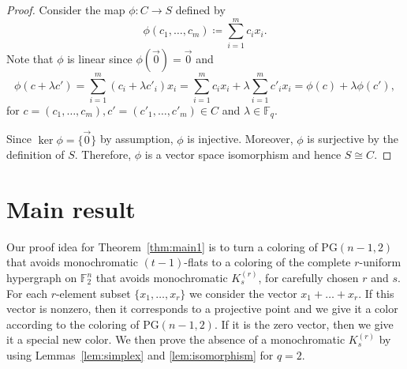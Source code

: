 \documentclass[a4paper,11pt]{amsproc}
\theoremstyle{plain}
\theoremstyle{definition}
\begin{document}
\begin{proof}
    Consider the map $\phi : C \to S$ defined by
    \[
        \phi(c_1,\ldots,c_m)
        \coloneqq \sum_{i=1}^{m} c_i x_i.
    \]
    Note that $\phi$ is linear since $\phi(\vec{0})=\vec{0}$ and
    \[
        \phi(c+\lambda c')
        = \sum_{i=1}^{m} (c_i+\lambda c'_i)x_i
        = \sum_{i=1}^{m} c_i x_i
        + \lambda\sum_{i=1}^{m} c'_i x_i
        = \phi(c)+\lambda\phi(c'),
    \]
    for $c=(c_1,\dots,c_m),c'=(c'_1,\dots,c'_m)\in C$ and
    $\lambda\in\mathbb{F}_q$.

    Since  $\ker \phi = \{\vec{0}\}$ by assumption,
    $\phi$ is injective. 
    Moreover, $\phi$ is surjective
    by the definition of $S$. Therefore, $\phi$ is a vector space isomorphism
    and hence $S \cong C$.
\end{proof}



\section{Main result}\label{sec3}
Our proof idea for Theorem~\ref{thm:main1} is to turn a coloring of $\mathrm{PG}(n - 1,2)$ that avoids monochromatic $(t - 1)$-flats to a coloring of the complete $r$-uniform hypergraph on $\mathbb{F}_2^n$ that avoids monochromatic $K_s^{(r)}$, for carefully chosen $r$ and $s$. 
For each $r$-element subset $\{x_1, \dots, x_r\}$ we consider the vector $x_1 + \dots + x_r$.
If this vector is nonzero, then it corresponds to a projective point and we give it a color according to the coloring of $\mathrm{PG}(n - 1, 2)$.
If it is the zero vector, then we give it a special new color. 
We then prove the absence of a monochromatic $K_s^{(r)}$ by using Lemmas~\ref{lem:simplex} and \ref{lem:isomorphism} for $q = 2$.
\end{document}
